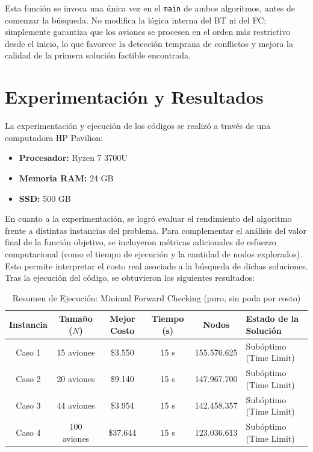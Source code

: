 \documentclass[12pt]{article}
\begin{document}
Esta función se invoca una única vez en el \texttt{main} de ambos algoritmos, antes de comenzar la búsqueda. No modifica la lógica interna del BT ni del FC; simplemente garantiza que los aviones se procesen en el orden más restrictivo desde el inicio, lo que favorece la detección temprana de conflictos y mejora la calidad de la primera solución factible encontrada.

\section{Experimentación y Resultados}

La experimentación y ejecución de los códigos se realizó a través de una computadora HP Pavilion:
\begin{itemize}
    \item \textbf{Procesador:} Ryzen 7 3700U
    \item \textbf{Memoria RAM:} 24 GB
    \item \textbf{SSD:} 500 GB
\end{itemize}

En cuanto a la experimentación, se logró evaluar el rendimiento del algoritmo frente a distintas instancias del problema. Para complementar el análisis del valor final de la función objetivo, se incluyeron métricas adicionales de esfuerzo computacional (como el tiempo de ejecución y la cantidad de nodos explorados). Esto permite interpretar el costo real asociado a la búsqueda de dichas soluciones. Tras la ejecución del código, se obtuvieron los siguientes resultados:

\begin{table}[H]
\centering
\renewcommand{\arraystretch}{1.2}
\vspace{0.2cm}
\begin{tabular}{|c|c|c|c|c|l|}
\hline
\textbf{Instancia} & \textbf{Tamaño ($N$)} & \textbf{Mejor Costo} & \textbf{Tiempo (s)} & \textbf{Nodos} & \textbf{Estado de la Solución} \\ \hline
Caso 1 & 15 aviones  & \$3.550   & 15 s & 155.576.625 & Subóptimo (Time Limit) \\ \hline
Caso 2 & 20 aviones  & \$9.140   & 15 s & 147.967.700 & Subóptimo (Time Limit) \\ \hline
Caso 3 & 44 aviones  & \$3.954   & 15 s & 142.458.357 & Subóptimo (Time Limit) \\ \hline
Caso 4 & 100 aviones & \$37.644  & 15 s & 123.036.613 & Subóptimo (Time Limit) \\ \hline
\end{tabular}
\caption{Resumen de Ejecución: Minimal Forward Checking (puro, sin poda por costo)}
\label{tabla:resumen_mfc}
\end{table}
\end{document}
